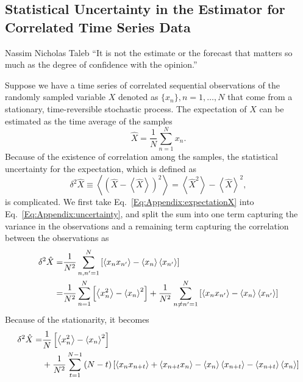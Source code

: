 \begin{appendices}
\chapter{Statistical Uncertainty in the Estimator for Correlated Time Series Data\label{chapter:Appendix:Uncertainty}}
\begin{chapquote}{Nassim Nicholas Taleb%
	}
	``It is not the estimate or the forecast that matters so much as the degree of confidence with the opinion.''
\end{chapquote}
Suppose we have a time series of correlated sequential observations of the randomly sampled variable $X$ denoted as $\{x_n\}, n=1,\dots,N$ that come from a stationary, time-reversible stochastic process. The expectation of $X$ can be estimated as the time average of the samples
\begin{equation}
  \hat X=\frac 1 N \sum\limits_{n=1}^{N} x_n.
  \label{Eq:Appendix:expectationX}
\end{equation}
Because of the existence of correlation among the samples, the statistical uncertainty for the expectation, which is defined as
\begin{equation}
	\delta^2 \hat X \equiv \left<\left(\hat X-\left<\hat X\right>\right)^2\right> = \left<\hat X^2 \right> -\left<\hat X\right>^2,
	\label{Eq:Appendix:uncertainty}
\end{equation}
is complicated. We first take Eq.~\ref{Eq:Appendix:expectationX} into Eq.~\ref{Eq:Appendix:uncertainty}, and split the sum into one term capturing the variance in the observations and a remaining term capturing the correlation between the observations as
\begin{align}
	\delta^2 \hat X=&\frac{1}{N^2}\sum\limits_{n,n^\prime=1}^{N}\left[\left<x_nx_{n^\prime}\right>-\left<x_n\right>\left<x_{n^\prime}\right>\right]\notag\\
	               =&\frac{1}{N^2}\sum\limits_{n=1}^{N}\left[\left<x_n^2\right>-\left<x_n\right>^2\right]+\frac{1}{N^2}\sum\limits_{n\neq n^\prime=1}^{N}\left[\left<x_nx_{n^\prime}\right>-\left<x_n\right>\left<x_{n^\prime}\right>\right]
\end{align}
Because of the stationarity, it becomes
\begin{align}
	\delta^2 \hat X=& \frac 1N\left[\left<x_n^2\right>-\left<x_n\right>^2\right] \notag\\
	&+\frac 1{N^2}\sum\limits_{t=1}^{N-1}\left(N-t\right)\left[\left<x_nx_{n+t}\right>+\left<x_{n+t}x_n\right>-\left<x_n\right>\left<x_{n+t}\right>-\left<x_{n+t}\right>\left<x_n\right>\right]

\end{align}
\end{appendices}
